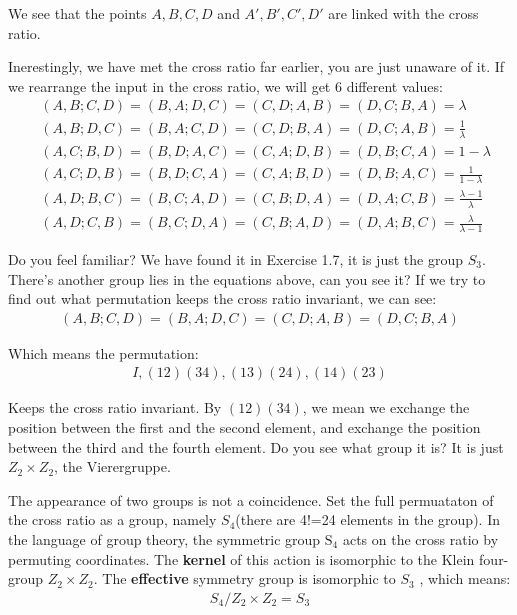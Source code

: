 \documentclass[]{ctexart}
\begin{document}
			We see that the points $A,B,C,D$ and $A',B',C',D'$ are linked with the cross ratio. 
			
			Inerestingly, we have met the cross ratio far earlier, you are just unaware of it. If we rearrange the input in the cross ratio, we will get 6 different values:
				\begin{equation*}
				\begin{aligned}
					&(A, B ; C, D)=(B, A ; D, C)=(C, D ; A, B)=(D, C ; B, A)=\lambda\\
					&(A, B ; D, C)=(B, A ; C, D)=(C, D ; B, A)=(D, C ; A, B)=\frac{1}{\lambda}\\
					&(A, C ; B, D)=(B, D ; A, C)=(C, A ; D, B)=(D, B ; C, A)=1-\lambda\\
					&(A, C ; D, B)=(B, D ; C, A)=(C, A ; B, D)=(D, B ; A, C)=\frac{1}{1-\lambda}\\
					&(A, D ; B, C)=(B, C ; A, D)=(C, B ; D, A)=(D, A ; C, B)=\frac{\lambda-1}{\lambda}\\
					&(A, D ; C, B)=(B, C ; D, A)=(C, B ; A, D)=(D, A ; B, C)=\frac{\lambda}{\lambda-1}
				\end{aligned}
				\end{equation*}
			
			Do you feel familiar? We have found it in Exercise 1.7, it is just the group $S_3$. There's another group lies in the equations above, can you see it? If we try to find out what permutation keeps the cross ratio invariant, we can see:
				\begin{equation*}
				\begin{aligned}
					(A, B ; C, D)=(B, A ; D, C)=(C, D ; A, B)=(D, C ; B, A)
				\end{aligned}
				\end{equation*}
			
			Which means the permutation:
				\begin{equation*}
				\begin{aligned}
					I, (12)(34),(13)(24),(14)(23)
				\end{aligned}
				\end{equation*}
			
			Keeps the cross ratio invariant. By $(12)(34)$, we mean we exchange the position between the first and the second element, and exchange the position between the third and the fourth element. Do you see what group it is? It is just $Z_2\times Z_2$, the Vierergruppe. 
			
			The appearance of two groups is not a coincidence. Set the full permuataton of the cross ratio as a group, namely $S_4$(there are 4!=24 elements in the group). In the language of group theory, the symmetric group $\mathrm{S}_{4}$ acts on the cross ratio by permuting coordinates. The \textbf{kernel} of this action is isomorphic to the Klein four-group $Z_2\times Z_2$.  The \textbf{effective} symmetry group is isomorphic to  $S_{3}$ , which means:
				\begin{equation*}
				\begin{aligned}
					S_4/Z_2\times Z_2=S_3
				\end{aligned}
				\end{equation*}
			
\end{document}
